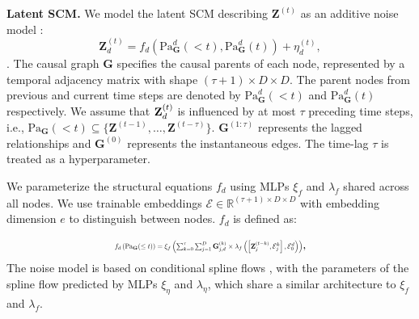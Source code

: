 


\textbf{Latent SCM.} We model the latent SCM describing $\mathbf{Z}^{(t)}$ as an additive noise model \citep{hoyer2008nonlinear}:
\begin{equation*}
    \mathbf{Z}_d^{(t)} = f_{d}\left(\text{Pa}^d_\mathbf{G}(<t), \text{Pa}^d_\mathbf{G}(t)\right) + \eta_d^{(t)}, 
\end{equation*}
. The causal graph $\mathbf{G}$ specifies the causal parents of each node, represented by a temporal adjacency matrix with shape $(\tau+1) \times D \times D$. The parent nodes from previous and current time steps are denoted by $\text{Pa}^d_\mathbf{G}(<t)$ and $\text{Pa}^d_\mathbf{G}(t)$ respectively.  We assume that $\mathbf{Z}^{(t)}_d$ is influenced by at most $\tau$ preceding time steps, i.e., $\text{Pa}_\mathbf{G}(<t) \subseteq \{ \mathbf{Z}^{(t-1)}, \dots, \mathbf{Z}^{(t-\tau)}\}$. $\mathbf{G}^{(1:\tau)}$ represents the lagged relationships and $\mathbf{G}^{(0)}$ represents the instantaneous edges. The time-lag $\tau$ is treated as a hyperparameter. 

  We parameterize the structural equations $f_d$ using MLPs $\xi_f$ and $\lambda_f$ shared across all nodes. We use trainable embeddings $\mathcal{E} \in \mathbb{R}^{(\tau+1)\times D \times D}$ with embedding dimension $e$ to distinguish between nodes. $f_d$ is defined as:

\begin{equation}
\resizebox{0.48\textwidth}{!}{$
  f_d\left( \text{Pa}_{\mathbf{G}}(\leq t) \right) = \xi_f \left( \sum_{k=0}^\tau \sum_{j=1}^{D} \mathbf{G}^{(k)}_{j,d} \times \lambda_f \left( \left[ \mathbf{Z}^{(t-k)}_{j}, \mathcal{E}^{k}_{j} \right], \mathcal{E}_{0}^{d} \right) \right)
$},
\label{eqn:rhino_eqn}
\end{equation}
The noise model is based on conditional spline flows \citep{durkan2019neural}, with the parameters of the spline flow predicted by MLPs $\xi_\eta$ and $\lambda_\eta$, which share a similar architecture to $\xi_f$ and $\lambda_f$. 

